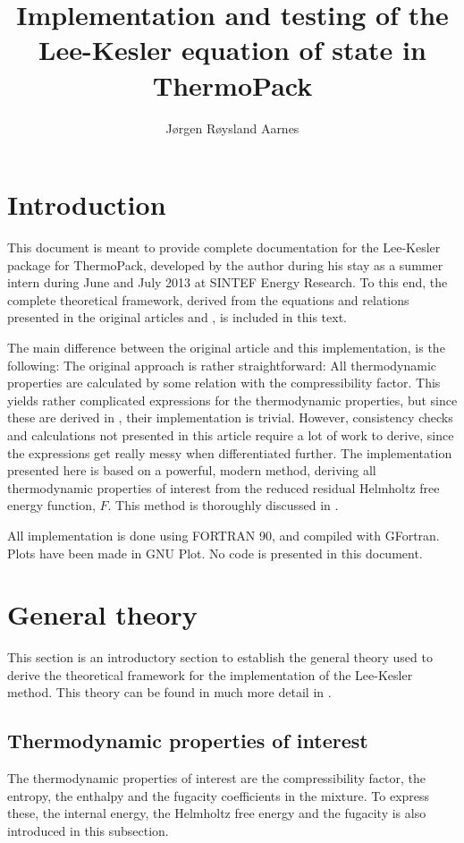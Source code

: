 \documentclass[english]{../thermomemo/thermomemo}
\title{Implementation and testing of the Lee-Kesler equation of state in ThermoPack}
\author{J\o rgen R\o ysland Aarnes}
\numberwithin{equation}{section}
\begin{document}
\frontmatter

\tableofcontents

\section{Introduction}
This document is meant to provide complete documentation for the Lee-Kesler package for ThermoPack, developed by the author during his stay as a summer intern during June and July 2013 at SINTEF Energy Research. To this end, the complete theoretical framework, derived from the equations and relations presented in the original articles \cite{LK} and \cite{PKP}, is included in this text.

The main difference between the original article and this implementation, is the following: The original approach is rather straightforward: All thermodynamic properties are calculated by some relation with the compressibility factor. This yields rather complicated expressions for the thermodynamic properties, but since these are derived in \cite{LK}, their implementation is trivial. However, consistency checks and calculations not presented in this article require a lot of work to derive, since the expressions get really messy when differentiated further. The implementation presented here is based on a powerful, modern method, deriving all thermodynamic properties of interest from the reduced residual Helmholtz free energy function, $F$. This method is thoroughly discussed in \cite{MM}.

All implementation is done using FORTRAN 90, and compiled with GFortran. Plots have been made in GNU Plot. No code is presented in this document.  

\section{General theory}
This section is an introductory section to establish the general theory used to derive the theoretical framework for the implementation of the Lee-Kesler method. This theory can be found in much more detail in \cite{MM}.
\subsection{Thermodynamic properties of interest}

The thermodynamic properties of interest are the compressibility factor, the entropy, the enthalpy and the fugacity coefficients in the mixture. To express these, the internal energy, the Helmholtz free energy and the fugacity is also introduced in this subsection.
\end{document}
